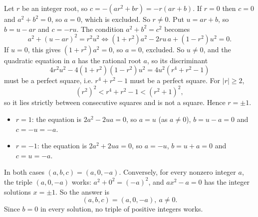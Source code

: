 Let $r$ be an integer root, so $c=-\left(ar^2+br\right)=-r(ar+b)$. If $r=0$ then $c=0$ and $a^2+b^2=0$, so $a=0$, which is excluded. So $r\ne0$. Put $u=ar+b$, so $b=u-ar$ and $c=-ru$. The condition $a^2+b^2=c^2$ becomes
\[a^2+(u-ar)^2=r^2u^2\iff\left(1+r^2\right)a^2-2ru\,a+\left(1-r^2\right)u^2=0.\]
If $u=0$, this gives $\left(1+r^2\right)a^2=0$, so $a=0$, excluded. So $u\ne0$, and the quadratic equation in $a$ has the rational root $a$, so its discriminant
\[4r^2u^2-4\left(1+r^2\right)\left(1-r^2\right)u^2=4u^2\left(r^4+r^2-1\right)\]
must be a perfect square, i.e. $r^4+r^2-1$ must be a perfect square. For $|r|\ge2$,
\[\left(r^2\right)^2<r^4+r^2-1<\left(r^2+1\right)^2,\]
so it lies strictly between consecutive squares and is not a square. Hence $r=\pm1$.
\begin{itemize}
\item $r=1$: the equation is $2a^2-2ua=0$, so $a=u$ (as $a\ne0$), $b=u-a=0$ and $c=-u=-a$.
\item $r=-1$: the equation is $2a^2+2ua=0$, so $a=-u$, $b=u+a=0$ and $c=u=-a$.
\end{itemize}
In both cases $(a,b,c)=(a,0,-a)$. Conversely, for every nonzero integer $a$, the triple $(a,0,-a)$ works: $a^2+0^2=(-a)^2$, and $ax^2-a=0$ has the integer solutions $x=\pm1$. So the answer is
\[\boxed{(a,b,c)=(a,0,-a),\ a\ne0}.\]
Since $b=0$ in every solution, no triple of positive integers works.
